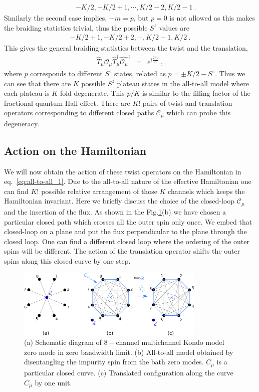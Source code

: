 \documentclass[12pt]{iopart}
\begin{document}
\begin{eqnarray}
&&-K/2,-K/2+1,\cdots,K/2-2,K/2-1~.
\end{eqnarray}
Similarly the second case implies, $-m=p$, but $p=0$ is not allowed as this makes the braiding statistics trivial, thus the possible $S^z$ values are 
\begin{eqnarray}
-K/2+1,-K/2+2,\cdots,K/2-1,K/2~.
\end{eqnarray}
This gives the general braiding statistics between the twist and the translation,
\begin{eqnarray}
\hat{T}_{\mu}\hat{\mathcal{O}_{\mu}} \hat{T}^{\dagger}_{\mu}\hat{\mathcal{O}_{\mu}}^{\dagger} &=& e^{i\frac{2\pi p}{K}}~,
\end{eqnarray}
where $p$ corresponds to different $S^z$ states, related as $p=\pm K/2-S^z$. Thus we can see that there are $K$ possible $S^z$ plateau states in the all-to-all model where each plateau is $K$ fold degenerate. This $p/K$ is similar to the filling factor of the fractional quantum Hall effect. There are $K!$ pairs of twist and translation operators corresponding to different closed paths $\mathcal{C}_{\mu}$ which can probe this degeneracy.

\subsection{Action on the Hamiltonian}
We will now obtain the action of these twist operators on the Hamiltonian in eq.~\ref{eq:all-to-all_1}. Due to the all-to-all nature of the effective Hamiltonian one can find $K!$ possible relative arrangement of those $K$ channels which keeps the Hamiltonian invariant. Here we briefly discuss the choice of the closed-loop $\mathcal{C}_{\mu}$ and the insertion of the flux. As shown in the Fig.\ref{fig:stargraph-to-alltoall}(b) we have chosen a particular closed path which crosses all the outer spin only once. We embed that closed-loop on a plane and put the flux perpendicular to the plane through the closed loop. One can find a different closed loop where the ordering of the outer spins will be different. The action of the translation operator shifts the outer spins along this closed curve by one step.

\begin{figure}[htpb]
	\centering
	\includegraphics[width=0.8\textwidth]{stargraphtoalltoall.png}
	\caption{(a) Schematic diagram of $8-$channel multichannel Kondo model zero mode in zero bandwidth limit. (b) All-to-all model obtained by disentangling the impurity spin from the bath zero modes. $C_{\mu}$ is a particular closed curve. (c) Translated configuration along the curve $C_{\mu}$ by one unit.}
	\label{fig:stargraph-to-alltoall}
\end{figure}
\end{document}
